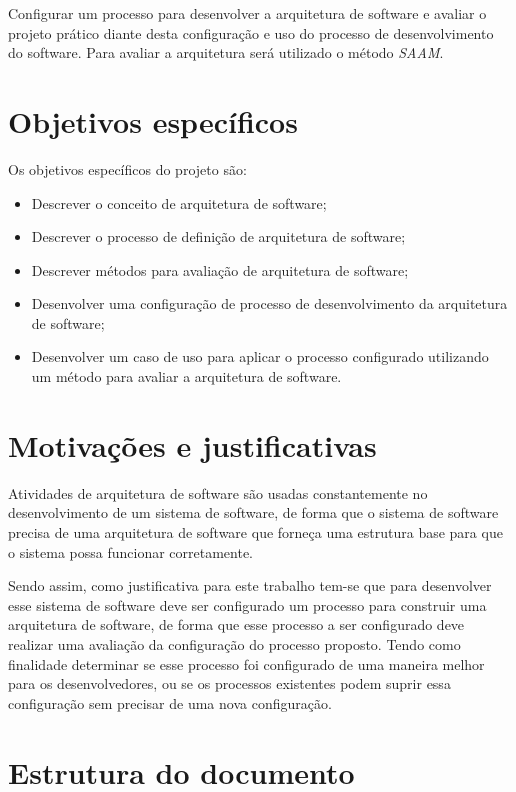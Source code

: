 Configurar um processo para desenvolver a arquitetura de software 
e avaliar o projeto prático diante desta configuração e uso do processo de desenvolvimento do software.
Para avaliar a arquitetura será utilizado o método \emph{\acrfull{SAAM}}.

\section{Objetivos específicos}

Os objetivos específicos do projeto são:
\begin{itemize}
    \item Descrever o conceito de arquitetura de software;
    \item Descrever o processo de definição de arquitetura de software;
    \item Descrever métodos para avaliação de arquitetura de software;
    \item Desenvolver uma configuração de processo de desenvolvimento da arquitetura de software;
    \item Desenvolver um caso de uso para aplicar o processo configurado utilizando um método para avaliar a arquitetura de software.
\end{itemize}

\section{Motivações e justificativas}

Atividades de arquitetura de software são usadas constantemente no desenvolvimento de um sistema de software, de forma que o sistema de software precisa de uma arquitetura de software que forneça uma estrutura base para que o sistema possa funcionar corretamente.


Sendo assim, como justificativa para este trabalho tem-se que para desenvolver esse sistema de software deve ser configurado um processo para construir uma arquitetura de software, de forma que esse processo a ser configurado deve realizar uma avaliação da configuração do processo proposto. Tendo como finalidade determinar se esse processo foi configurado de uma maneira melhor para os desenvolvedores, ou se os processos existentes podem suprir essa configuração sem precisar de uma nova configuração.

\section{Estrutura do documento}

